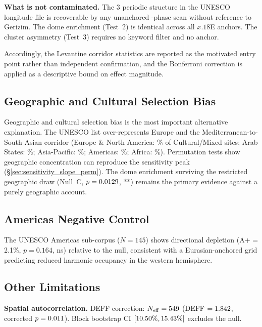 \documentclass[HARVARD,twocolumn]{USG}
\begin{document}
\textbf{What is not contaminated.}
The 3\textdegree{} periodic structure in the UNESCO longitude file is
recoverable by any unanchored \NharmonicsCoarse-phase scan without
reference to Gerizim. The dome enrichment (Test~2) is identical across
all \NharmonicsCoarse{} $x.18$\textdegree{}E anchors. The cluster
asymmetry (Test~3) requires no keyword filter and no anchor.

Accordingly, the Levantine corridor statistics are reported as the motivated
entry point rather than independent confirmation, and the Bonferroni
correction is applied as a descriptive bound on effect magnitude.

\subsection{Geographic and Cultural Selection Bias}

Geographic and cultural selection bias is the most important alternative
explanation. The UNESCO list over-represents Europe and the
Mediterranean-to-South-Asian corridor
(Europe \& North America: \CorpusPctEurope\% of Cultural/Mixed sites;
Arab States: \CorpusPctArabStates\%;
Asia-Pacific: \CorpusPctAsiaPac\%;
Americas: \CorpusPctLatAm\%;
Africa: \CorpusPctAfrica\%).
Permutation tests show geographic concentration can reproduce the
sensitivity peak (\S\ref{sec:sensitivity_slope_perm}). The dome
enrichment surviving the restricted geographic draw (Null~C,
$p = 0.0129$, **) remains the primary evidence against
a purely geographic account.


\subsection{Americas Negative Control}
\label{sec:americas_negative_control}
The UNESCO Americas sub-corpus ($N = 145$) shows directional 
depletion (A+ = 2.1\%, $p = 0.164$, ns) relative to the 
\NullRateAp{} null, consistent with a Eurasian-anchored grid 
predicting reduced harmonic occupancy in the western hemisphere.

\subsection{Other Limitations}

\textbf{Spatial autocorrelation.}
DEFF correction: $N_\mathrm{eff} = 549$ (DEFF $= 1.842$,
corrected $p = 0.011$). Block bootstrap CI
$[10.50\%, 15.43\%]$ excludes the \NullRateAp{} null.
\end{document}
